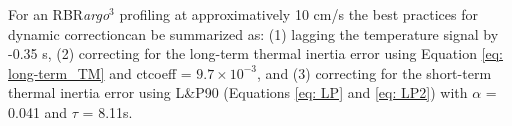\documentclass{ametsocV6.1}
\begin{document}
For an RBR\textit{argo}$^3$ profiling at approximatively 10 cm/s the best practices for dynamic correctioncan be summarized as: (1) lagging the temperature signal by -0.35 s, (2) correcting for the long-term thermal inertia error using Equation \ref{eq: long-term_TM} and ctcoeff = $9.7\times10^{-3}$, and (3) correcting for the short-term thermal inertia error using L\&P90 (Equations \ref{eq: LP} and \ref{eq: LP2}) with $\alpha$ = 0.041 and $\tau$ = 8.11s.

%

%
\end{document}

